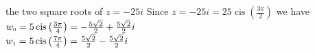 { the two square roots of $z = -25i$}
{ Since $z=-25i = 25\operatorname{cis}\left(\frac{3\pi}{2}\right)$ we have \\$w_{\text{\tiny$0$}} = 5\operatorname{cis}\left(\frac{3\pi}{4}\right) = -\frac{5\sqrt{2}}{2} +\frac{5\sqrt{2}}{2} i$\\$w_{\text{\tiny$1$}} = 5\operatorname{cis}\left(\frac{7\pi}{4}\right) = \frac{5\sqrt{2}}{2} - \frac{5\sqrt{2}}{2} i$}
